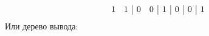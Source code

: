 \begin{enumerate}
\begin{solution}
\begin{displaymath}
\begin{array}{c c|c c|c|c|c|c}
        1 & 1 & 0 & 0 & 1 & 0 & 0 & 1\\
      \end{array}
    \end{displaymath}
    Или дерево вывода:
    \begin{prooftree}
    \end{prooftree}
  \end{solution}
\end{enumerate}
\clearpage
